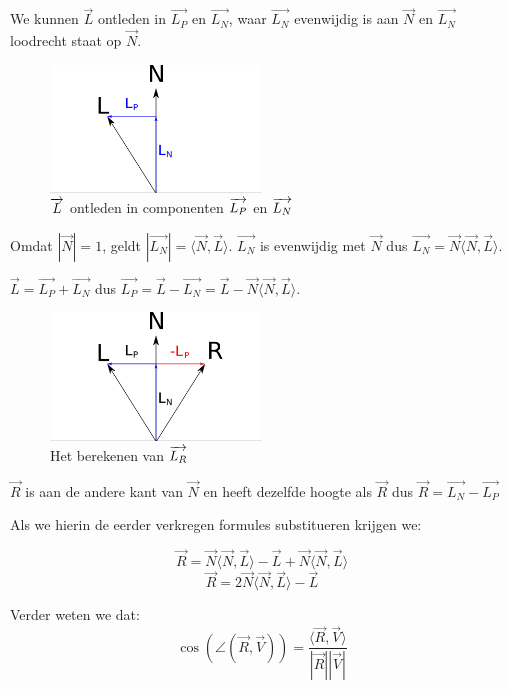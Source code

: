 \documentclass[12pt, a4paper]{article}
\newcommand*{\ora}{\overrightarrow}
\begin{document}
We kunnen $\ora{L}$ ontleden in $\ora{L_P}$ en $\ora{L_N}$, waar $\ora{L_N}$ evenwijdig is aan $\ora{N}$ en $\ora{L_N}$ loodrecht staat op $\ora{N}$.

\begin{figure}[H]
    \centering
    \includegraphics[width=0.50\textwidth]{L_decomposition.png}
    \caption{$\protect\overrightarrow{L}$ ontleden in componenten $\protect\overrightarrow{L_P}$ en $\protect\overrightarrow{L_N}$}
    \label{fig:L_decomposition}
\end{figure}

Omdat $\left|\ora{N}\right| = 1$, geldt $\left|\ora{L_N}\right|=\langle\ora{N},\ora{L}\rangle$. $\ora{L_N}$ is evenwijdig met $\ora{N}$ dus $\ora{L_N}=\ora{N}\langle\ora{N},\ora{L}\rangle$.

$\ora{L}=\ora{L_P}+\ora{L_N}$ dus $\ora{L_P}=\ora{L}-\ora{L_N}=\ora{L}-\ora{N}\langle\ora{N},\ora{L}\rangle$.

\begin{figure}[H]
    \centering
    \includegraphics[width=0.50\textwidth]{LR_Calculation.png}
    \caption{Het berekenen van $\protect\ora{L_R}$}
    \label{fig:LR_Calculation}
\end{figure}

$\ora{R}$ is aan de andere kant van $\ora{N}$ en heeft dezelfde hoogte als $\ora{R}$ dus $\ora{R}=\ora{L_N}-\ora{L_P}$

Als we hierin de eerder verkregen formules substitueren krijgen we:

\[\ora{R}=\ora{N}\langle\ora{N},\ora{L}\rangle-\ora{L}+\ora{N}\langle\ora{N},\ora{L}\rangle\]
\[\ora{R}=2\ora{N}\langle\ora{N},\ora{L}\rangle-\ora{L}\]

Verder weten we dat:
\[\cos\left(\angle\left(\ora{R}, \ora{V}\right)\right)=\frac{\langle\ora{R},\ora{V}\rangle}{\left|\ora{R}\right|\left|\ora{V}\right|}\]
\end{document}
